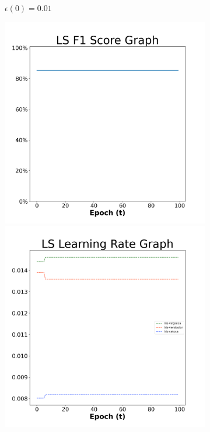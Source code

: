 \begin{figure}[H]
\begin{subfigure}{0.3\textwidth}
  \caption{$\epsilon(0)=0.01$}
\end{subfigure}\hfil %
\begin{subfigure}{0.3\textwidth}
  \includegraphics[width=\linewidth]{images/exper2/iris/LS_0.03_f1.png}
  \includegraphics[width=\linewidth]{images/exper2/iris/LS_0.03_lr.png}

\end{subfigure}
\end{figure}
